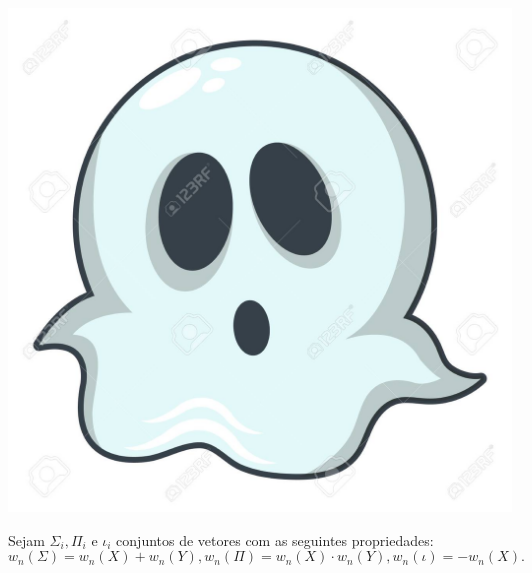 \documentclass[11pt,twoside,a4paper]{book}
\begin{document}
\includegraphics[scale=10]{92624337-ghost-icon-cartoon-illustration-of-ghost-vector-icon-for-web.jpg}
\begin{definicao}
Sejam $\Sigma_i, \Pi_i$ e $\iota_i$ conjuntos de vetores com as seguintes propriedades:
\[
w_n(\Sigma) = w_n(X) + w_n(Y), w_n(\Pi) = w_n(X) \cdot w_n(Y), w_n(\iota) = - w_n(X).
\]
\end{definicao}
\end{document}
